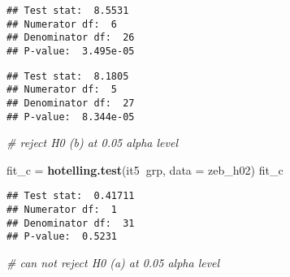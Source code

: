 \documentclass[]{article}
\newenvironment{Shaded}{\begin{snugshade}}{\end{snugshade}}
\newcommand{\CommentTok}[1]{\textcolor[rgb]{0.56,0.35,0.01}{\textit{#1}}}
\newcommand{\DataTypeTok}[1]{\textcolor[rgb]{0.13,0.29,0.53}{#1}}
\newcommand{\FloatTok}[1]{\textcolor[rgb]{0.00,0.00,0.81}{#1}}
\newcommand{\KeywordTok}[1]{\textcolor[rgb]{0.13,0.29,0.53}{\textbf{#1}}}
\newcommand{\NormalTok}[1]{#1}
\newcommand{\OperatorTok}[1]{\textcolor[rgb]{0.81,0.36,0.00}{\textbf{#1}}}
\newcommand{\StringTok}[1]{\textcolor[rgb]{0.31,0.60,0.02}{#1}}
\begin{document}
\begin{verbatim}
## Test stat:  8.5531 
## Numerator df:  6 
## Denominator df:  26 
## P-value:  3.495e-05
\end{verbatim}

\begin{Shaded}
\end{Shaded}

\begin{verbatim}
## Test stat:  8.1805 
## Numerator df:  5 
## Denominator df:  27 
## P-value:  8.344e-05
\end{verbatim}

\begin{Shaded}
\begin{Highlighting}[]
\CommentTok{# reject H0 (b) at 0.05 alpha level}

\NormalTok{fit_c =}\StringTok{ }\KeywordTok{hotelling.test}\NormalTok{(it5}\OperatorTok{~}\NormalTok{grp, }\DataTypeTok{data =}\NormalTok{ zeb_h02)}
\NormalTok{fit_c}
\end{Highlighting}
\end{Shaded}

\begin{verbatim}
## Test stat:  0.41711 
## Numerator df:  1 
## Denominator df:  31 
## P-value:  0.5231
\end{verbatim}

\begin{Shaded}
\begin{Highlighting}[]
\CommentTok{# can not reject H0 (a) at 0.05 alpha level}
\end{Highlighting}
\end{Shaded}
\end{document}
